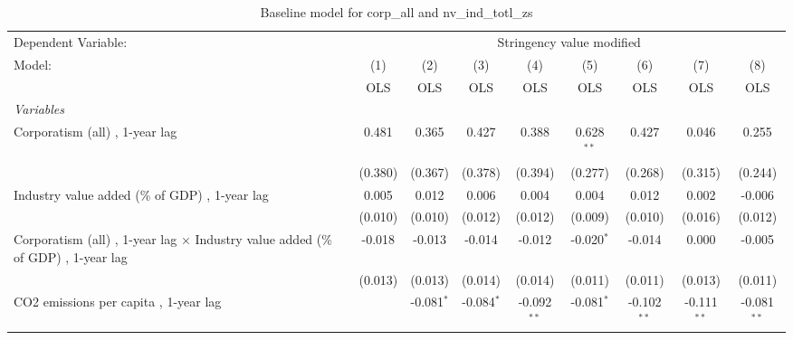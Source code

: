 
\begin{table}[htbp]
   \caption{Baseline model for corp\_all and nv\_ind\_totl\_zs}
   \centering
   \begin{tabular}{lcccccccc}
      \toprule
      Dependent Variable: & \multicolumn{8}{c}{Stringency value modified}\\
      Model:                                                                                  & (1)     & (2)          & (3)          & (4)           & (5)           & (6)           & (7)           & (8)\\  
                                                                                              &  OLS    & OLS          & OLS          & OLS           & OLS           & OLS           & OLS           & OLS\\  
      \midrule
      \emph{Variables}\\
      Corporatism (all) , 1-year lag                                                          & 0.481   & 0.365        & 0.427        & 0.388         & 0.628$^{**}$  & 0.427         & 0.046         & 0.255\\   
                                                                                              & (0.380) & (0.367)      & (0.378)      & (0.394)       & (0.277)       & (0.268)       & (0.315)       & (0.244)\\   
      Industry value added (\% of GDP) , 1-year lag                                           & 0.005   & 0.012        & 0.006        & 0.004         & 0.004         & 0.012         & 0.002         & -0.006\\   
                                                                                              & (0.010) & (0.010)      & (0.012)      & (0.012)       & (0.009)       & (0.010)       & (0.016)       & (0.012)\\   
      Corporatism (all) , 1-year lag $\times$ Industry value added (\% of GDP) , 1-year lag   & -0.018  & -0.013       & -0.014       & -0.012        & -0.020$^{*}$  & -0.014        & 0.000         & -0.005\\   
                                                                                              & (0.013) & (0.013)      & (0.014)      & (0.014)       & (0.011)       & (0.011)       & (0.013)       & (0.011)\\   
      CO2 emissions per capita , 1-year lag                                                   &         & -0.081$^{*}$ & -0.084$^{*}$ & -0.092$^{**}$ & -0.081$^{*}$  & -0.102$^{**}$ & -0.111$^{**}$ & -0.081$^{**}$\\   

\end{tabular}
\end{table}
